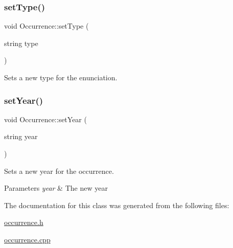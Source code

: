 \subsubsection{\texorpdfstring{set\+Type()}{setType()}}
{\footnotesize\ttfamily void Occurrence\+::set\+Type (\begin{DoxyParamCaption}\item[{string}]{type }\end{DoxyParamCaption})}



Sets a new type for the enunciation. 

\mbox{\label{class_occurrence_a2b5961ee7403112083776b8f4f4b4a14}} 
\subsubsection{\texorpdfstring{set\+Year()}{setYear()}}
{\footnotesize\ttfamily void Occurrence\+::set\+Year (\begin{DoxyParamCaption}\item[{string}]{year }\end{DoxyParamCaption})}



Sets a new year for the occurrence. 


\begin{DoxyParams}{Parameters}
{\em year} & The new year \\
\hline
\end{DoxyParams}


The documentation for this class was generated from the following files\+:\begin{DoxyCompactItemize}
\item 
\hyperlink{occurrence_8h}{occurrence.\+h}\item 
\hyperlink{occurrence_8cpp}{occurrence.\+cpp}\end{DoxyCompactItemize}
